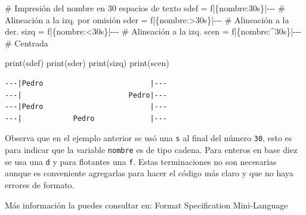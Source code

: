 \documentclass[
  spanish,
  letterpaper,
]{scrbook}
\newenvironment{Shaded}{\begin{snugshade}}{\end{snugshade}}
\newcommand{\BuiltInTok}[1]{\textcolor[rgb]{0.00,0.23,0.31}{#1}}
\newcommand{\CommentTok}[1]{\textcolor[rgb]{0.37,0.37,0.37}{#1}}
\newcommand{\NormalTok}[1]{\textcolor[rgb]{0.00,0.23,0.31}{#1}}
\newcommand{\OperatorTok}[1]{\textcolor[rgb]{0.37,0.37,0.37}{#1}}
\newcommand{\SpecialCharTok}[1]{\textcolor[rgb]{0.37,0.37,0.37}{#1}}
\newcommand{\SpecialStringTok}[1]{\textcolor[rgb]{0.13,0.47,0.30}{#1}}
\theoremstyle{definition}
\theoremstyle{remark}
\begin{document}
\begin{Shaded}
\begin{Highlighting}[]
\CommentTok{\# Impresión del nombre en 30 espacios de texto}
\NormalTok{sdef }\OperatorTok{=} \SpecialStringTok{f\textquotesingle{}{-}{-}{-}|}\SpecialCharTok{\{}\NormalTok{nombre}\SpecialCharTok{:30s\}}\SpecialStringTok{|{-}{-}{-}\textquotesingle{}}  \CommentTok{\# Alineación a la izq. por omisión}
\NormalTok{sder }\OperatorTok{=} \SpecialStringTok{f\textquotesingle{}{-}{-}{-}|}\SpecialCharTok{\{}\NormalTok{nombre}\SpecialCharTok{:\textgreater{}30s\}}\SpecialStringTok{|{-}{-}{-}\textquotesingle{}} \CommentTok{\# Alineación a la der.}
\NormalTok{sizq }\OperatorTok{=} \SpecialStringTok{f\textquotesingle{}{-}{-}{-}|}\SpecialCharTok{\{}\NormalTok{nombre}\SpecialCharTok{:\textless{}30s\}}\SpecialStringTok{|{-}{-}{-}\textquotesingle{}} \CommentTok{\# Alineación a la izq.}
\NormalTok{scen }\OperatorTok{=} \SpecialStringTok{f\textquotesingle{}{-}{-}{-}|}\SpecialCharTok{\{}\NormalTok{nombre}\SpecialCharTok{:\^{}30s\}}\SpecialStringTok{|{-}{-}{-}\textquotesingle{}} \CommentTok{\# Centrada}

\BuiltInTok{print}\NormalTok{(sdef)}
\BuiltInTok{print}\NormalTok{(sder)}
\BuiltInTok{print}\NormalTok{(sizq)}
\BuiltInTok{print}\NormalTok{(scen)}
\end{Highlighting}
\end{Shaded}

\begin{verbatim}
---|Pedro                         |---
---|                         Pedro|---
---|Pedro                         |---
---|            Pedro             |---
\end{verbatim}

\begin{tcolorbox}[enhanced jigsaw, colframe=quarto-callout-note-color-frame, opacityback=0, toprule=.15mm, colback=white, coltitle=black, leftrule=.75mm, arc=.35mm, breakable, left=2mm, bottomtitle=1mm, rightrule=.15mm, bottomrule=.15mm, colbacktitle=quarto-callout-note-color!10!white, toptitle=1mm, titlerule=0mm, opacitybacktitle=0.6, title=\textcolor{quarto-callout-note-color}{\faInfo}\hspace{0.5em}{Nota.}]

Observa que en el ejemplo anterior se usó una \texttt{s} al final del
número \texttt{30}, esto es para indicar que la variable \texttt{nombre}
es de tipo cadena. Para enteros en base diez se usa una \texttt{d} y
para flotantes una \texttt{f}. Estas terminaciones no son necesarias
aunque es conveniente agregarlas para hacer el código más claro y que no
haya errores de formato.

Más información la puedes consultar en: Format Specification
Mini-Language

\end{tcolorbox}
\end{document}
